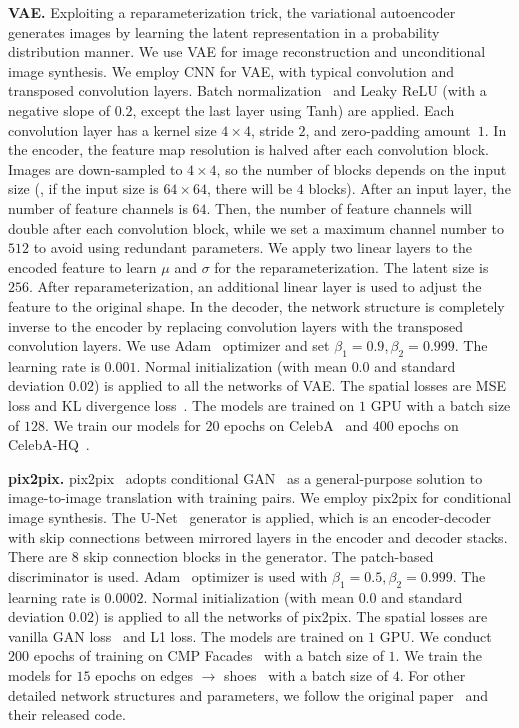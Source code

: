 \documentclass[10pt,twocolumn,letterpaper]{article}
\begin{document}
\vspace{0.05cm}
\noindent
\textbf{VAE.}
Exploiting a reparameterization trick, the variational autoencoder~\cite{vae} generates images by learning the latent representation in a probability distribution manner.
We use VAE for image reconstruction and unconditional image synthesis.
We employ CNN for VAE, with typical convolution and transposed convolution layers. Batch normalization~\cite{BN} and Leaky ReLU (with a negative slope of $0.2$, except the last layer using Tanh) are applied. Each convolution layer has a kernel size $4 \times 4$, stride $2$, and zero-padding amount~$1$.
In the encoder, the feature map resolution is halved after each convolution block. Images are down-sampled to $4\times4$, so the number of blocks depends on the input size (\eg, if the input size is $64 \times 64$, there will be $4$ blocks). After an input layer, the number of feature channels is $64$. Then, the number of feature channels will double after each convolution block, while we set a maximum channel number to $512$ to avoid using redundant parameters.
We apply two linear layers to the encoded feature to learn $\mu$ and $\sigma$ for the reparameterization. The latent size is $256$. After reparameterization, an additional linear layer is used to adjust the feature to the original shape.
In the decoder, the network structure is completely inverse to the encoder by replacing convolution layers with the transposed convolution layers.
We use Adam~\cite{adam} optimizer and set $\beta_1=0.9, \beta_2=0.999$. The learning rate is $0.001$. Normal initialization (with mean $0.0$ and standard deviation $0.02$) is applied to all the networks of VAE.
The spatial losses are MSE loss and KL divergence loss~\cite{vae}.
The models are trained on $1$ GPU with a batch size of $128$.
We train our models for $20$ epochs on CelebA~\cite{celeba} and $400$ epochs on CelebA-HQ~\cite{pggan}.


\vspace{0.05cm}
\noindent
\textbf{pix2pix.}
pix2pix~\cite{pix2pix} adopts conditional GAN~\cite{congan} as a general-purpose solution to image-to-image translation with training pairs.
We employ pix2pix for conditional image synthesis.
The U-Net~\cite{unet} generator is applied, which is an encoder-decoder with skip connections between mirrored layers in the encoder and decoder stacks. There are $8$ skip connection blocks in the generator.
The patch-based discriminator is used.
Adam~\cite{adam} optimizer is used with $\beta_1=0.5, \beta_2=0.999$. The learning rate is $0.0002$. Normal initialization (with mean $0.0$ and standard deviation $0.02$) is applied to all the networks of pix2pix.
The spatial losses are vanilla GAN loss~\cite{GAN} and L1 loss.
The models are trained on $1$ GPU.
We conduct $200$ epochs of training on CMP Facades~\cite{cmpfacades} with a batch size of $1$. We train the models for $15$ epochs on edges $\rightarrow$ shoes~\cite{shoesutzappos50K} with a batch size of $4$.
For other detailed network structures and parameters, we follow the original paper~\cite{pix2pix} and their released code.
\end{document}
